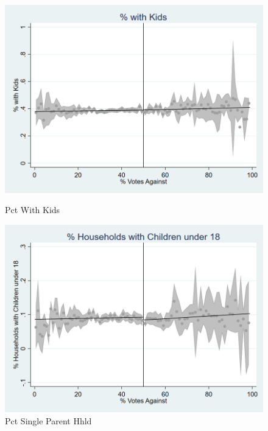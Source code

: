 \begin{figure}[ht]
    
    \begin{minipage}[b]{0.40\textwidth}
        \centering
        \includegraphics[width=\textwidth,keepaspectratio]{images/cov_smoothness_pctwithkids.png}
        \caption*{Pct With Kids}
        \label{fig:pct_with_kids_sm}
    \end{minipage}
    \hfill
    \begin{minipage}[b]{0.40\textwidth}
        \centering
        \includegraphics[width=\textwidth,keepaspectratio]{images/cov_smoothness_pctsinparhhld.png}
        \caption*{Pct Single Parent Hhld}
        \label{fig:pctsinparhhld_sm}
    \end{minipage}
    

\end{figure}
